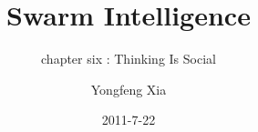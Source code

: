 \documentclass[CJK]{beamer}
\begin{document}
\begin{CJK*}{GBK}{song}

\title{Swarm Intelligence}
\subtitle{chapter six : Thinking Is Social}

\author{Yongfeng Xia}

\date{2011-7-22}

\begin{frame}
\maketitle
\end{frame}

\begin{frame}
\end{frame}



\end{CJK*}
\end{document}
